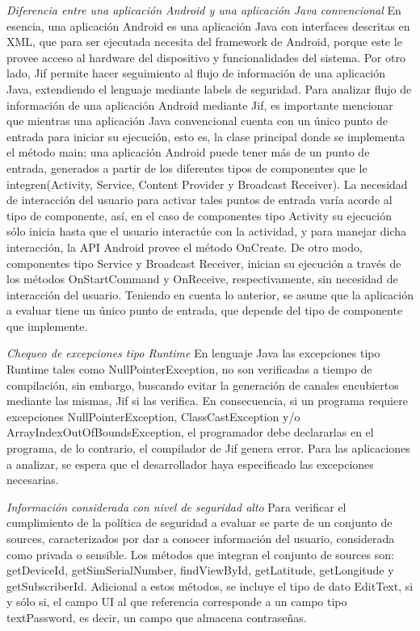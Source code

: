 \textit{Diferencia entre una aplicación Android y una aplicación Java
convencional}\newline 
En esencia, una aplicación Android es una aplicación Java con interfaces
descritas en XML, que para ser ejecutada necesita del framework de Android,
porque este le provee acceso al hardware del dispositivo y funcionalidades del
sistema.\newline 
Por otro lado, Jif permite hacer seguimiento al flujo de información de una
aplicación Java, extendiendo el lenguaje mediante labels de seguridad.\newline
Para analizar flujo de información de una aplicación Android mediante
Jif, es importante mencionar que mientras una aplicación Java convencional
cuenta con un único punto de entrada para iniciar su ejecución, esto es, la
clase principal donde se implementa el método main; una aplicación Android puede
tener más de un punto de entrada, generados a partir de los diferentes tipos de
componentes que le integren(Activity, Service, Content Provider y Broadcast
Receiver). La necesidad de interacción del usuario para activar tales puntos de
entrada varía acorde al tipo de componente, así, en el caso de componentes tipo
Activity su ejecución sólo inicia hasta que el usuario interactúe con la
actividad, y para manejar dicha interacción, la API Android provee el método
OnCreate. De otro modo, componentes tipo Service y Broadcast Receiver, inician
su ejecución a través de los métodos OnStartCommand y OnReceive,
respectivamente, sin necesidad de interacción del usuario.\newline 
{ \color{black} {Teniendo en cuenta lo anterior, se asume que la aplicación a
evaluar tiene un único punto de entrada, que depende del tipo de componente que
implemente.} }

\textit{Chequeo de excepciones tipo Runtime}\newline
En lenguaje Java las excepciones tipo Runtime tales como NullPointerException, no
son verificadas a tiempo de compilación, sin embargo, buscando evitar la
generación de canales encubiertos mediante las mismas, Jif si las verifica. 
En consecuencia, si un programa requiere excepciones NullPointerException,
ClassCastException y/o ArrayIndexOutOfBoundsException, el programador debe
declararlas en el programa, de lo contrario, el compilador de Jif genera error.
Para las aplicaciones a analizar, se espera que el desarrollador haya
especificado las excepciones necesarias.

\textit{Información considerada con nivel de seguridad alto}\newline
Para verificar el cumplimiento de la política de seguridad a evaluar se parte de
un conjunto de sources, caracterizados por dar a conocer información del usuario, 
considerada como privada o sensible. Los métodos que integran el conjunto de sources son: 
getDeviceId, getSimSerialNumber, findViewById, getLatitude, getLongitude y
getSubscriberId. Adicional a estos métodos, se incluye el tipo de dato EditText,
si y sólo si, el campo UI al que referencia corresponde a un campo tipo
textPassword, es decir, un campo que almacena contraseñas.

